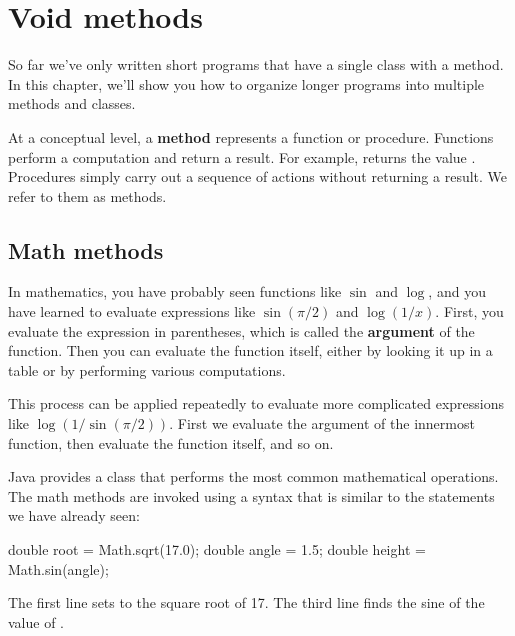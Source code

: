 \chapter{Void methods}

So far we've only written short programs that have a single class with a  method.
In this chapter, we'll show you how to organize longer programs into multiple methods and classes.


At a conceptual level, a {\bf method} represents a function or procedure.
Functions perform a computation and return a result.
For example,  returns the value .
Procedures simply carry out a sequence of actions without returning a result.
We refer to them as  methods.


\section{Math methods}


In mathematics, you have probably seen functions like $\sin$ and $\log$, and you have learned to evaluate expressions like $\sin(\pi/2)$ and $\log(1/x)$.
First, you evaluate the expression in parentheses, which is called the {\bf argument} of the function.
Then you can evaluate the function itself, either by looking it up in a table or by performing various computations.

This process can be applied repeatedly to evaluate more complicated expressions like $\log(1/\sin(\pi/2))$.
First we evaluate the argument of the innermost function, then evaluate the function itself, and so on.

Java provides a  class that performs the most common mathematical operations.
The math methods are invoked using a syntax that is similar to the  statements we have already seen:

\begin{code}
    double root = Math.sqrt(17.0);
    double angle = 1.5;
    double height = Math.sin(angle);
\end{code}

The first line sets  to the square root of 17.
The third line finds the sine of the value of .

